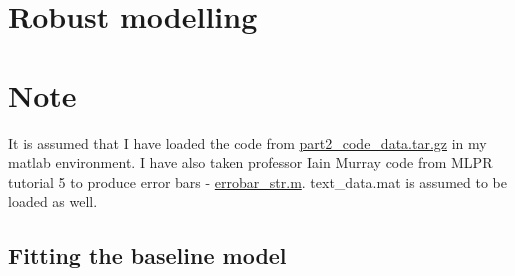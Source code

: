 \documentclass{article}
\begin{document}
		\section{Robust modelling}
			\section*{Note}
				It is assumed that I have loaded the code from \href{http://www.inf.ed.ac.uk/teaching/courses/mlpr/2015/assignment/part2_code_data.tar.gz}{part2\_code\_data.tar.gz} in my matlab environment. I have also taken professor Iain Murray code from MLPR tutorial 5 to produce error bars - \href{http://homepages.inf.ed.ac.uk/imurray2/code/imurray-matlab/errorbar_str.m}{errobar\_str.m}. text\_data.mat is assumed to be loaded as well.
			\subsection{Fitting the baseline model}
\end{document}
